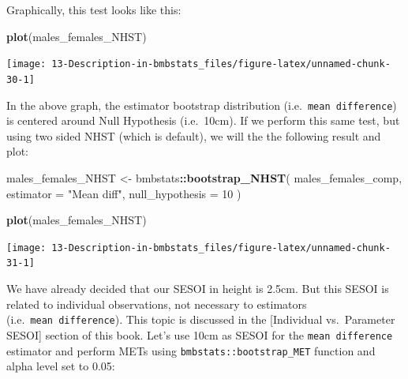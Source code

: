 \documentclass[
]{book}
\newenvironment{Shaded}{\begin{snugshade}}{\end{snugshade}}
\newcommand{\DataTypeTok}[1]{\textcolor[rgb]{0.13,0.29,0.53}{#1}}
\newcommand{\DecValTok}[1]{\textcolor[rgb]{0.00,0.00,0.81}{#1}}
\newcommand{\KeywordTok}[1]{\textcolor[rgb]{0.13,0.29,0.53}{\textbf{#1}}}
\newcommand{\NormalTok}[1]{#1}
\newcommand{\OperatorTok}[1]{\textcolor[rgb]{0.81,0.36,0.00}{\textbf{#1}}}
\newcommand{\StringTok}[1]{\textcolor[rgb]{0.31,0.60,0.02}{#1}}
\begin{document}
Graphically, this test looks like this:

\begin{Shaded}
\begin{Highlighting}[]
\KeywordTok{plot}\NormalTok{(males\_females\_NHST)}
\end{Highlighting}
\end{Shaded}

\begin{center}\texttt{[image: 13-Description-in-bmbstats\_files/figure-latex/unnamed-chunk-30-1]} \end{center}

In the above graph, the estimator bootstrap distribution (i.e.~\texttt{mean\ difference}) is centered around Null Hypothesis (i.e.~10cm). If we perform this same test, but using two sided NHST (which is default), we will the the following result and plot:

\begin{Shaded}
\begin{Highlighting}[]
\NormalTok{males\_females\_NHST <{-}}\StringTok{ }\NormalTok{bmbstats}\OperatorTok{::}\KeywordTok{bootstrap\_NHST}\NormalTok{(}
\NormalTok{  males\_females\_comp,}
  \DataTypeTok{estimator =} \StringTok{"Mean diff"}\NormalTok{,}
  \DataTypeTok{null\_hypothesis =} \DecValTok{10}
\NormalTok{)}

\KeywordTok{plot}\NormalTok{(males\_females\_NHST)}
\end{Highlighting}
\end{Shaded}

\begin{center}\texttt{[image: 13-Description-in-bmbstats\_files/figure-latex/unnamed-chunk-31-1]} \end{center}

We have already decided that our SESOI in height is 2.5cm. But this SESOI is related to individual observations, not necessary to estimators (i.e.~\texttt{mean\ difference}). This topic is discussed in the {[}Individual vs.~Parameter SESOI{]} section of this book. Let's use 10cm as SESOI for the \texttt{mean\ difference} estimator and perform METs using \texttt{bmbstats::bootstrap\_MET} function and alpha level set to 0.05:
\end{document}
